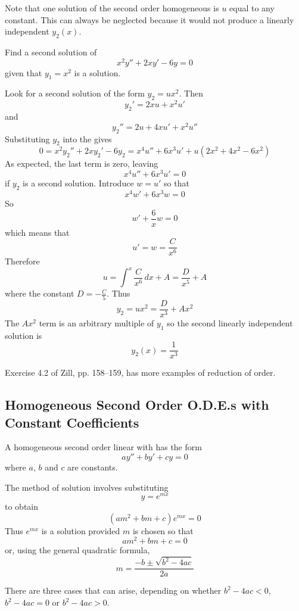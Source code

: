 Note that one solution of the second order homogeneous \ODE is $u$ equal
to any constant.  This can always be neglected because it would not produce
a linearly independent $y_2(x)$.

\begin{example}
\problem Find a second solution of 
$$x^2y''+2xy'-6y=0$$
given that $y_1=x^2$ is a solution.

\solution Look for a second solution of the form $y_2=ux^2$.  Then
$$y_2'=2xu+x^2u'$$
and
$$y_2''=2u+4xu'+x^2u''$$
Substituting $y_2$ into the \ODE gives
$$0=x^2y_2''+2xy_2'-6y_2=x^4u''+6x^3u'+u(2x^2+4x^2-6x^2)$$
As expected, the last term is zero, leaving
$$x^4u''+6x^3u'=0$$
if $y_2$ is a second solution.  Introduce $w=u'$ so that
$$x^4w'+6x^3w=0$$
So
$$w'+\frac{6}{x}w=0$$ which means that
$$u'=w=\frac{C}{x^6}$$
Therefore
$$u=\int^x \frac{C}{x^6}\,dx+A=\frac{D}{x^5}+A$$
where the constant $D=-\frac{C}{5}$.  Thus
$$y_2=ux^2=\frac{D}{x^3}+Ax^2$$
The $Ax^2$ term is an arbitrary multiple of $y_1$ so the second linearly
independent solution is
$$y_2(x)=\frac{1}{x^3}$$
\end{example}

\begin{exercise}
Exercise 4.2 of Zill, pp. 158--159, has more examples of reduction of order.
\end{exercise}

\subsection{Homogeneous Second Order O.D.E.s with Constant Coefficients}

A homogeneous second order linear \ODE with 
has the form
$$ay''+by'+cy=0$$
where $a$, $b$ and $c$ are constants.

The method of solution involves substituting 
$$y=e^{mx}$$
to obtain
$$(am^2+bm+c)e^{mx}=0$$
Thus $e^{mx}$ is a solution provided $m$ is chosen so that
$$am^2+bm+c=0$$
or, using the general quadratic formula,
$$m=\frac{-b\pm\sqrt{b^2-4ac}}{2a}$$

There are three cases that can arise, depending on whether $b^2-4ac<0$,
$b^2-4ac=0$ or $b^2-4ac>0$.


